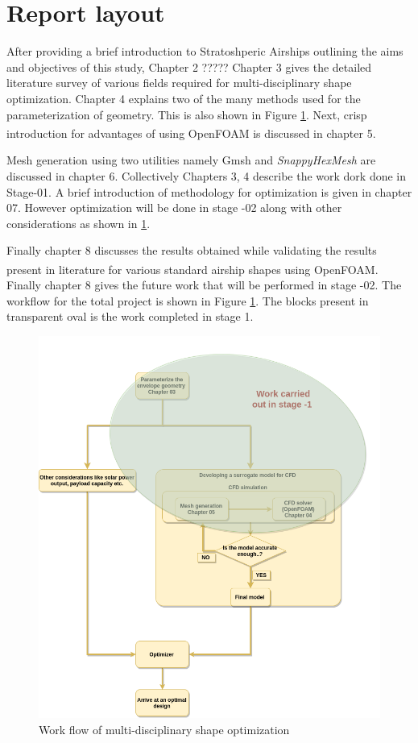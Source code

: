 \section{Report layout}

After providing a brief introduction to Stratoshperic Airships outlining the aims and objectives of this study, Chapter 2 ?????
 Chapter 3 gives the detailed literature survey of various fields required for multi-disciplinary shape optimization. Chapter 4  explains two of the many methods used for the parameterization of geometry. This is also shown in Figure \ref{Report layout}. Next, crisp introduction for advantages of using OpenFOAM\textsuperscript{\textregistered} is discussed in chapter 5. 

Mesh generation using two utilities namely Gmsh and \textit{SnappyHexMesh} are discussed in chapter 6. Collectively Chapters 3, 4 describe the work dork done in Stage-01. A brief introduction of methodology for optimization is given in chapter 07. However optimization will be done in stage -02 along with other considerations as shown in \ref{Report layout}. 

Finally chapter 8 discusses the results obtained while validating the results present in literature for various standard airship shapes using OpenFOAM\textsuperscript{\textregistered}. Finally chapter 8 gives the future work that will be performed in stage -02. The workflow for the total project is shown in Figure \ref{Report layout}. The blocks present in transparent oval is the work completed in stage 1. 

\begin{figure}[htbp]
	\includegraphics[width=\textwidth]{layout/layout.png} 
	\caption{Work flow of multi-disciplinary shape optimization}
	\label{Report layout} %
\end{figure}


